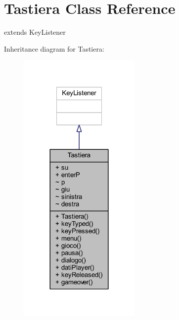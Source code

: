 \hypertarget{classa_1_1survival_1_1game_1_1_tastiera}{}\section{Tastiera Class Reference}
\label{classa_1_1survival_1_1game_1_1_tastiera}


extends Key\+Listener  




Inheritance diagram for Tastiera\+:
\nopagebreak
\begin{figure}[H]
\begin{center}
\leavevmode
\includegraphics[width=168pt]{classa_1_1survival_1_1game_1_1_tastiera__inherit__graph}
\end{center}
\end{figure}


